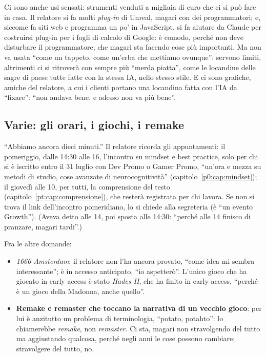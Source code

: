 Ci sono anche usi sensati: strumenti venduti a migliaia di euro che ci si può
fare in casa. Il relatore si fa molti \emph{plug-in} di Unreal, magari con dei
programmatori; e, siccome fa siti web e programma un po' in JavaScript, si fa
aiutare da Claude per costruirsi plug-in per i fogli di calcolo di Google: è
comodo, perché non deve disturbare il programmatore, che magari sta facendo
cose più importanti. Ma non va usata ``come un tappeto, come un'erba che
mettiamo ovunque'': servono limiti, altrimenti ci si ritroverà con sempre più
``merda piatta'', come le locandine delle sagre di paese tutte fatte con la
stessa IA, nello stesso stile. E ci sono grafiche, amiche del relatore, a cui i
clienti portano una locandina fatta con l'IA da ``fixare'': ``non andava bene,
e adesso non va più bene''.

\subsection{Varie: gli orari, i giochi, i remake}

``Abbiamo ancora dieci minuti.'' Il relatore ricorda gli appuntamenti: il
pomeriggio, dalle 14:30 alle 16, l'incontro su mindset e best practice, solo
per chi si è iscritto entro il 31 luglio con Dev Promo o Gamer Promo, ``un'ora
e mezza su metodi di studio, cose avanzate di neurocognitività''
(capitolo~\ref{p0:cap:mindset}); il giovedì alle 10, per tutti, la
comprensione del testo (capitolo~\ref{pt:cap:comprensione}), che resterà registrata per chi lavora. Se non si
trova il link dell'incontro pomeridiano, lo si chiede alla segreteria (è ``un
evento Growth''). (Aveva detto alle 14, poi sposta alle 14:30: ``perché alle
14 finisco di pranzare, magari tardi''.)

Fra le altre domande:
\begin{itemize}
  \item \emph{1666 Amsterdam}: il relatore non l'ha ancora provato, ``come
        idea mi sembra interessante''; è in accesso anticipato, ``io
        aspetterò''. L'unico gioco che ha giocato in early access è stato
        \emph{Hades II}, che ha finito in early access, ``perché è un gioco
        della Madonna, anche quello''.
  \item \textbf{Remake e remaster che toccano la narrativa di un vecchio
        gioco}: per lui è anzitutto un problema di terminologia, ``potato,
        potahto'': lo chiamerebbe \emph{remake}, non \emph{remaster}. Ci sta,
        magari non stravolgendo del tutto ma aggiustando qualcosa, perché negli
        anni le cose possono cambiare; stravolgere del tutto, no.
\end{itemize}

